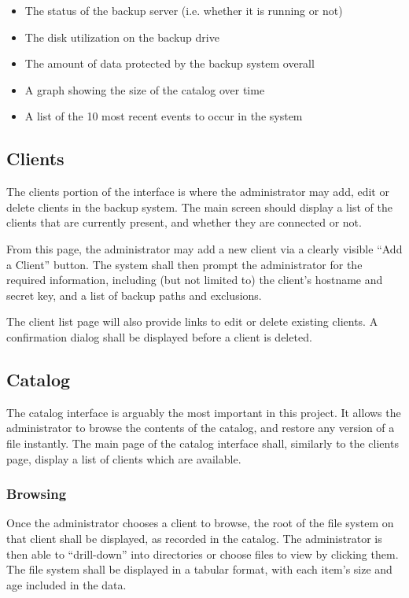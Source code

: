 \begin{itemize}
    \item The status of the backup server (i.e. whether it is running or not)
    \item The disk utilization on the backup drive
    \item The amount of data protected by the backup system overall
    \item A graph showing the size of the catalog over time
    \item A list of the 10 most recent events to occur in the system
\end{itemize}

\subsection{Clients}

The clients portion of the interface is where the administrator may add, edit
or delete clients in the backup system. The main screen should display a list
of the clients that are currently present, and whether they are connected or
not.

From this page, the administrator may add a new client via a clearly visible
``Add a Client'' button. The system shall then prompt the administrator for the
required information, including (but not limited to) the client's hostname and
secret key, and a list of backup paths and exclusions.

The client list page will also provide links to edit or delete existing
clients. A confirmation dialog shall be displayed before a client is deleted.

\subsection{Catalog}

The catalog interface is arguably the most important in this project. It allows
the administrator to browse the contents of the catalog, and restore any
version of a file instantly. The main page of the catalog interface shall,
similarly to the clients page, display a list of clients which are available.

\subsubsection{Browsing}

Once the administrator chooses a client to browse, the root of the file system
on that client shall be displayed, as recorded in the catalog. The
administrator is then able to ``drill-down'' into directories or choose files
to view by clicking them. The file system shall be displayed in a tabular
format, with each item's size and age included in the data.

